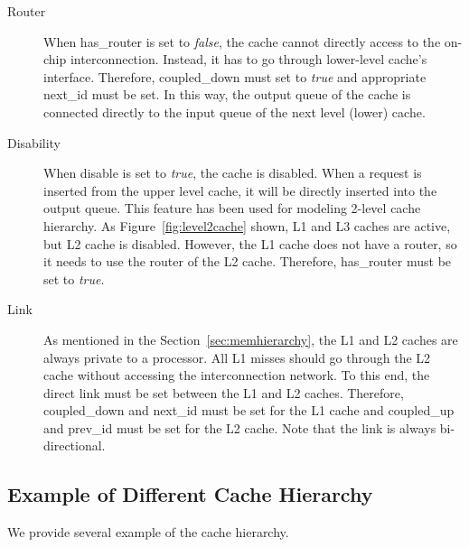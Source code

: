 \begin{description}
  \item[Router] When \textsf{has\_router} is set to \textit{false},
  the cache cannot directly access to the on-chip
  interconnection. Instead, it has to go through lower-level cache's
  interface. Therefore, \textsf{coupled\_down} must set
  to \textit{true} and appropriate \textsf{next\_id} must be set. In
  this way, the output queue of the cache is connected directly to the
  input queue of the next level (lower) cache.

  \item[Disability] When \textsf{disable} is set to \textit{true}, the
  cache is disabled. When a request is inserted from the upper level
  cache, it will be directly inserted into the output queue. This
  feature has been used for modeling 2-level cache hierarchy. As
  Figure~\ref{fig:level2cache} shown, L1 and L3 caches are active, but
  L2 cache is disabled. However, the L1 cache does not have a router,
  so it needs to use the router of the L2
  cache. Therefore, \textsf{has\_router} must be set to \textit{true}.

  \item[Link] As mentioned in the Section~\ref{sec:memhierarchy}, the
  L1 and L2 caches are always private to a processor. All L1 misses
  should go through the L2 cache without accessing the interconnection
  network. To this end, the direct link must be set between the L1 and
  L2 caches. Therefore, \textsf{coupled\_down} and \textsf{next\_id}
  must be set for the L1 cache and \textsf{coupled\_up}
  and \textsf{prev\_id} must be set for the L2 cache. Note that the
  link is always bi-directional.

\end{description}

\subsection{Example of Different Cache Hierarchy}

We provide several example of the cache hierarchy.

